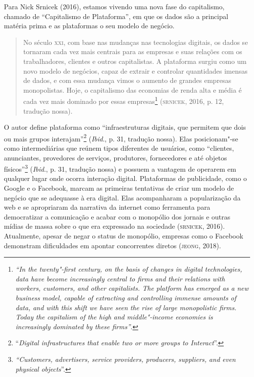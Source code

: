 Para Nick Srnicek (2016), estamos vivendo uma nova fase do capitalismo,
chamado de ``Capitalismo de Plataforma'', em que os dados são a
principal matéria prima e as plataformas o seu modelo de negócio.

\begin{quote}
No século \textsc{xxi}, com base nas mudanças nas tecnologias digitais, os dados
se tornaram cada vez mais centrais para as empresas e suas relações com
os trabalhadores, clientes e outros capitalistas. A plataforma surgiu
como um novo modelo de negócios, capaz de extrair e controlar
quantidades imensas de dados, e com essa mudança vimos o aumento de
grandes empresas monopolistas. Hoje, o capitalismo das economias de
renda alta e média é cada vez mais dominado por essas empresas\footnote{\emph{``In
  the twenty"-first century, on the basis of changes in digital
  technologies, data have become increasingly central to firms and their
  relations with workers, customers, and other capitalists. The platform
  has emerged as a new business model, capable of extracting and
  controlling immense amounts of data, and with this shift we have seen
  the rise of large monopolistic firms. Today the capitalism of the high
  and middle"-income economies is increasingly dominated by these
  firms''}.} (\textsc{srnicek}, 2016, p. 12, tradução nossa).
\end{quote}

O autor define plataforma como ``infraestruturas digitais, que permitem
que dois ou mais grupos interajam''\footnote{``\emph{Digital infrastructures
  that enable two or more groups to Interact}''.} (\emph{Ibid}., p. 31, tradução
nossa). Elas posicionam"-se como intermediárias que reúnem tipos
diferentes de usuários, como ``clientes, anunciantes, provedores de
serviços, produtores, fornecedores e até objetos físicos''\footnote{\emph{``Customers,
  advertisers, service providers, producers, suppliers, and even
  physical objects}''.} (\emph{Ibid}., p. 31, tradução nossa) e possuem a vantagem
de operarem em qualquer lugar onde ocorra interação digital. Plataformas
de publicidade, como o Google e o Facebook, marcam as primeiras
tentativas de criar um modelo de negócio que se adequasse à era digital.
Elas acompanharam a popularização da web e se apropriaram da narrativa
da internet como ferramenta para democratizar a comunicação e acabar com
o monopólio dos jornais e outras mídias de massa sobre o que era
expressado na sociedade (\textsc{srnicek}, 2016). Atualmente, apesar de negar o
status de monopólio, empresas como o Facebook demonstram dificuldades em
apontar concorrentes diretos (\textsc{jeong}, 2018).

